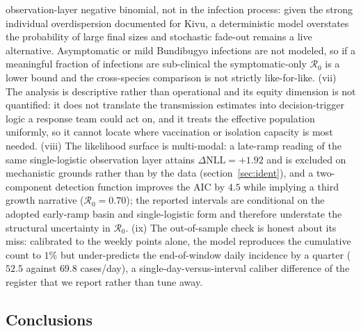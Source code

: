 \documentclass[preprint,12pt,numbers]{elsarticle}
\newcommand{\Reff}{\mathcal{R}}
\begin{document}
observation-layer negative binomial, not in the infection process: given
the strong individual overdispersion documented for Kivu, a
deterministic model overstates the probability of large final sizes and
stochastic fade-out remains a live alternative. Asymptomatic or mild
Bundibugyo infections are not modeled, so if a meaningful fraction of
infections are sub-clinical the symptomatic-only $\Reff_0$ is a lower
bound and the cross-species comparison is not strictly like-for-like.
(vii) The analysis is descriptive rather than operational and its equity
dimension is not quantified: it does not translate the transmission
estimates into decision-trigger logic a response team could act on, and
it treats the effective population uniformly, so it cannot locate where
vaccination or isolation capacity is most needed. (viii) The likelihood
surface is multi-modal: a late-ramp reading of the same single-logistic
observation layer attains $\Delta\mathrm{NLL}=+1.92$ and is excluded on
mechanistic grounds rather than by the data (section~\ref{sec:ident}),
and a two-component detection function improves the AIC by $4.5$ while
implying a third growth narrative ($\Reff_0=0.70$); the reported
intervals are conditional on the adopted early-ramp basin and
single-logistic form and therefore understate the structural uncertainty
in $\Reff_0$. (ix) The out-of-sample check is honest about its miss:
calibrated to the weekly points alone, the model reproduces the
cumulative count to $1\%$ but under-predicts the end-of-window daily
incidence by a quarter ($52.5$ against $69.8$ cases/day), a
single-day-versus-interval caliber difference of the register that we
report rather than tune away.
\subsection{Conclusions}
\end{document}
